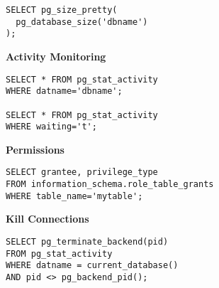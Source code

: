 \documentclass[10pt]{article}
\begin{document}
\begin{multicols}{2}
\begin{lstlisting}
SELECT pg_size_pretty(
  pg_database_size('dbname')
);
\end{lstlisting}

\textbf{\color{purpleheader}Activity Monitoring}
\begin{lstlisting}
SELECT * FROM pg_stat_activity 
WHERE datname='dbname';

SELECT * FROM pg_stat_activity 
WHERE waiting='t';
\end{lstlisting}

\textbf{\color{purpleheader}Permissions}
\begin{lstlisting}
SELECT grantee, privilege_type 
FROM information_schema.role_table_grants
WHERE table_name='mytable';
\end{lstlisting}

\textbf{\color{purpleheader}Kill Connections}
\begin{lstlisting}
SELECT pg_terminate_backend(pid)
FROM pg_stat_activity 
WHERE datname = current_database() 
AND pid <> pg_backend_pid();
\end{lstlisting}

\end{multicols}
\end{document}
